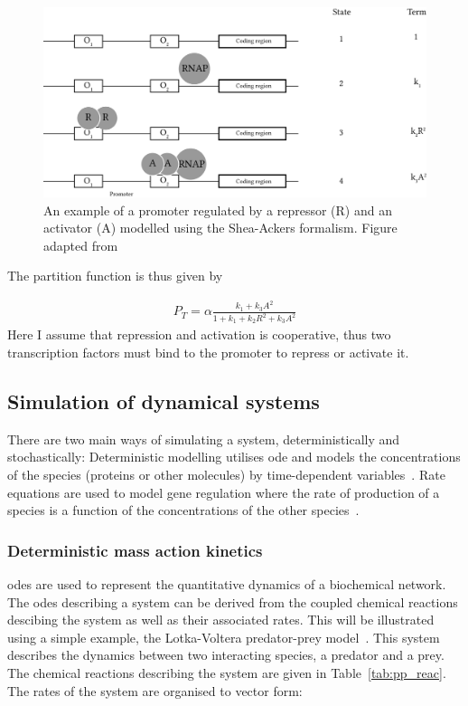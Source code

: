\begin{figure}[htb]
\centerfloat
    \includegraphics[scale=0.8]{../../chapters/chapterBackgr/images/shea-ackers.png}
    \caption[Shea-Ackers formalism example]{An example of a promoter regulated by a repressor (R) and an activator (A) modelled using the Shea-Ackers formalism. Figure adapted from~\textcite{Woods:2016eh}}
    \label{fig:shea_ack_ex}
\end{figure}

The partition function is thus given by 

\begin{align*}
	P_{T} = \alpha \frac{k_1 + k_{3}A^2}{1 + k_1 + k_{2}R^2 + k_{3}A^2}
\end{align*}
Here I assume that repression and activation is cooperative, thus two transcription factors must bind to the promoter to repress or activate it. 
\newpage
\subsection{Simulation of dynamical systems}

There are two main ways of simulating a system, deterministically and stochastically: Deterministic modelling utilises \acrshort{ode} and models the concentrations of the species (proteins or other molecules) by time-dependent variables~\autocite{deJong:2002ft}. Rate equations are used to model gene regulation where the rate of production of a species is a function of the concentrations of the other species~\autocite{deJong:2002ft}. 

\subsubsection{Deterministic mass action kinetics}
\label{sec:predator_prey_odes}
\acrshort{ode}s are used to represent the quantitative dynamics of a biochemical network. The \acrshort{ode}s describing a system can be derived from the coupled chemical reactions descibing the system as well as their associated rates. This will be illustrated using a simple example, the Lotka-Voltera predator-prey model~\autocite{lotka:voltera}. This system describes the dynamics between two interacting species, a predator and a prey. The chemical reactions describing the system are given in Table~\ref{tab:pp_reac}. The rates of the system are organised to vector form:


